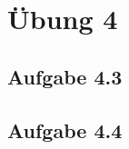 \documentclass{standalone}
\begin{document}
 
\section{Übung 4}

\subsection{Aufgabe 4.3}

\subsection{Aufgabe 4.4}
\end{document}
